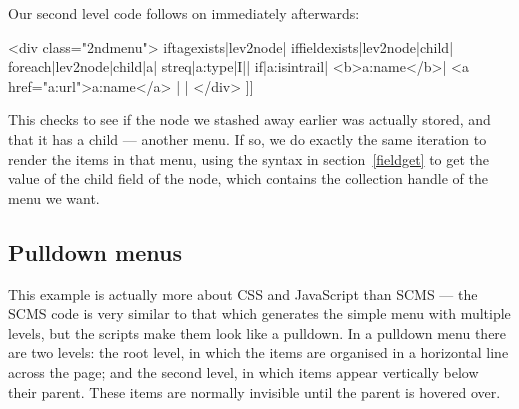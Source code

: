 Our second level code follows on immediately afterwards:
\begin{MyVerbatim}
    <div class="2ndmenu">
    {{iftagexists|lev2node|
        {{iffieldexists|{{lev2node}}|child|
            {{foreach|{{lev2node|child}}|a|
                {{streq|{{a:type}}|I||
                    {{if|{{a:isintrail}}|
                        <b>{{a:name}}</b>|
                        <a href="{{a:url}}">{{a:name}}</a>
                    }}
                }}
            }}
        |}}
    |}}
    </div>
]]
\end{MyVerbatim}
This checks to see if the node we stashed away earlier was actually stored, and that it has
a child --- another menu. If so, we do exactly the same iteration to render the items in that
menu, using the syntax in section~\ref{fieldget} to get the value of the child field of the node,
which contains the collection handle of the menu we want.


\subsection{Pulldown menus}
\label{pulldownmenu}
This example is actually more about CSS and JavaScript than SCMS --- the SCMS code
is very similar to that which generates the simple menu with multiple levels, but the 
scripts make them look like a pulldown.
In a pulldown menu there are two levels: the root level, in which the items
are organised in a horizontal line across the page; and the second level, in
which items appear vertically below their parent. These items are normally
invisible until the parent is hovered over.


